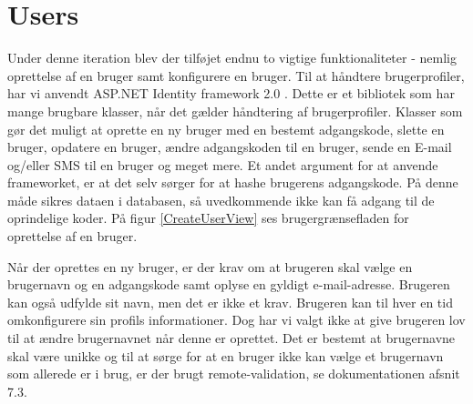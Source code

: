 \section{Users}

Under denne iteration blev der tilføjet endnu to vigtige funktionaliteter - nemlig oprettelse af en bruger samt konfigurere en bruger. Til at håndtere brugerprofiler, har vi anvendt ASP.NET Identity framework 2.0 \citep{msdnIdentityFrameworkWeb}. Dette er et bibliotek som har mange brugbare klasser, når det gælder håndtering af brugerprofiler. Klasser som gør det muligt at oprette en ny bruger med en bestemt adgangskode, slette en bruger, opdatere en bruger, ændre adgangskoden til en bruger, sende en E-mail og/eller SMS til en bruger og meget mere. Et andet argument for at anvende frameworket, er at det selv sørger for at hashe brugerens adgangskode. På denne måde sikres dataen i databasen, så uvedkommende ikke kan få adgang til de oprindelige koder.
På figur \ref{CreateUserView} ses brugergrænsefladen for oprettelse af en bruger.


Når der oprettes en ny bruger, er der krav om at brugeren skal vælge en brugernavn og en adgangskode samt oplyse en gyldigt e-mail-adresse. Brugeren kan også udfylde sit navn, men det er ikke et krav. Brugeren kan til hver en tid omkonfigurere sin profils informationer. Dog har vi valgt ikke at give brugeren lov til at ændre brugernavnet når denne er oprettet. Det er bestemt at brugernavne skal være unikke og til at sørge for at en bruger ikke kan vælge et brugernavn som allerede er i brug, er der brugt remote-validation, se dokumentationen afsnit 7.3.
